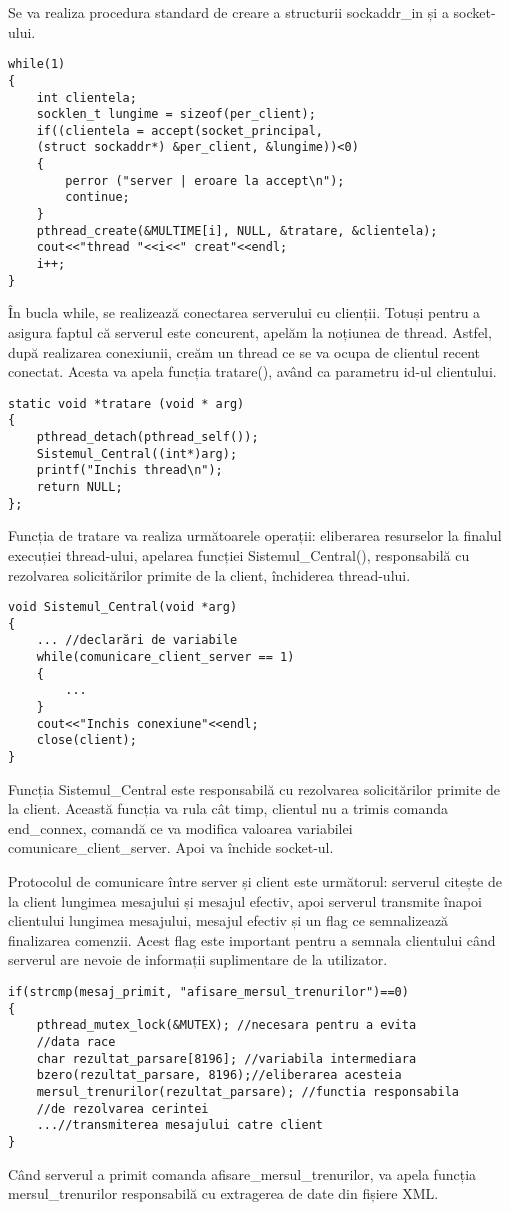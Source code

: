 \documentclass[runningheads]{llncs}
\begin{document}
Se va realiza procedura standard de creare a structurii sockaddr\_in și a socket-ului.
\begin{verbatim}
while(1)
{
    int clientela;
    socklen_t lungime = sizeof(per_client);
    if((clientela = accept(socket_principal, 
    (struct sockaddr*) &per_client, &lungime))<0)
    {
        perror ("server | eroare la accept\n");
        continue;
    }
    pthread_create(&MULTIME[i], NULL, &tratare, &clientela);
    cout<<"thread "<<i<<" creat"<<endl;
    i++;
}
\end{verbatim}
În bucla while, se realizează conectarea serverului cu clienții. Totuși pentru a asigura faptul că serverul este concurent, apelăm la noțiunea de thread. Astfel, după realizarea conexiunii, creăm un thread ce se va ocupa de clientul recent conectat. Acesta va apela funcția tratare(), având ca parametru id-ul clientului.

\begin{verbatim}
static void *tratare (void * arg)
{
    pthread_detach(pthread_self());
    Sistemul_Central((int*)arg);
    printf("Inchis thread\n");
    return NULL;
};
\end{verbatim}
Funcția de tratare va realiza următoarele operații: eliberarea resurselor la finalul execuției thread-ului, apelarea funcției Sistemul\_Central(), responsabilă cu rezolvarea solicitărilor primite de la client, închiderea thread-ului.

\begin{verbatim}
void Sistemul_Central(void *arg)
{
    ... //declarări de variabile
    while(comunicare_client_server == 1)
    {
        ...
    }
    cout<<"Inchis conexiune"<<endl;
    close(client);
}
\end{verbatim}
Funcția Sistemul\_Central este responsabilă cu rezolvarea solicitărilor primite de la client. Această funcția va rula cât timp, clientul nu a trimis comanda end\_connex, comandă ce va modifica valoarea variabilei comunicare\_client\_server. Apoi va închide socket-ul.

Protocolul de comunicare între server și client este următorul: serverul citește de la client lungimea mesajului și mesajul efectiv, apoi serverul transmite înapoi clientului lungimea mesajului, mesajul efectiv și un flag ce semnalizează finalizarea comenzii. Acest flag este important pentru a semnala clientului când serverul are nevoie de informații suplimentare de la utilizator.

\begin{verbatim}
if(strcmp(mesaj_primit, "afisare_mersul_trenurilor")==0)
{
    pthread_mutex_lock(&MUTEX); //necesara pentru a evita 
    //data race
    char rezultat_parsare[8196]; //variabila intermediara
    bzero(rezultat_parsare, 8196);//eliberarea acesteia
    mersul_trenurilor(rezultat_parsare); //functia responsabila
    //de rezolvarea cerintei
    ...//transmiterea mesajului catre client
}
\end{verbatim}
Când serverul a primit comanda afisare\_mersul\_trenurilor, va apela funcția mersul\_trenurilor responsabilă cu extragerea de date din fișiere XML.
\end{document}
